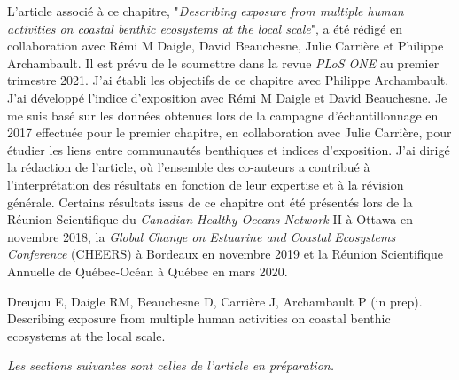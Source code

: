 L'article associé à ce chapitre, "\textit{Describing exposure from multiple human activities on coastal benthic ecosystems at the local scale}", a été rédigé en collaboration avec Rémi M Daigle, David Beauchesne, Julie Carrière et Philippe Archambault. Il est prévu de le soumettre dans la revue \textit{PLoS ONE} au premier trimestre 2021. J'ai établi les objectifs de ce chapitre avec Philippe Archambault. J'ai développé l'indice d'exposition avec Rémi M Daigle et David Beauchesne. Je me suis basé sur les données obtenues lors de la campagne d'échantillonnage en 2017 effectuée pour le premier chapitre, en collaboration avec Julie Carrière, pour étudier les liens entre communautés benthiques et indices d'exposition. J'ai dirigé la rédaction de l'article, où l'ensemble des co-auteurs a contribué à l'interprétation des résultats en fonction de leur expertise et à la révision générale. Certains résultats issus de ce chapitre ont été présentés lors de la Réunion Scientifique du \textit{Canadian Healthy Oceans Network} II à Ottawa en novembre 2018, la \textit{Global Change on Estuarine and Coastal Ecosystems Conference} (CHEERS) à Bordeaux en novembre 2019 et la Réunion Scientifique Annuelle de Québec-Océan à Québec en mars 2020. \linebreak[4]

\begin{singlespace}
Dreujou E, Daigle RM, Beauchesne D, Carrière J, Archambault P (in prep). Describing exposure from multiple human activities on coastal benthic ecosystems at the local scale.
\end{singlespace}

\textit{Les sections suivantes sont celles de l’article en préparation.}
